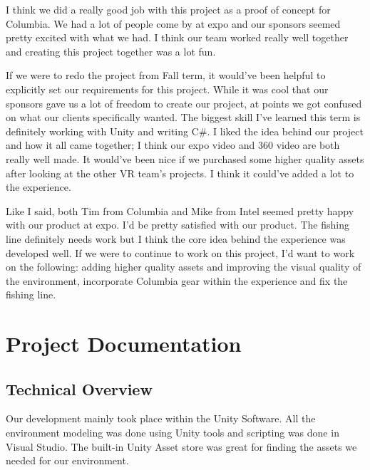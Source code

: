 \documentclass[10pt,journal,compsoc,onecolumn, draftclsnofoot]{IEEEtran}
\begin{document}
I think we did a really good job with this project as a proof of concept for Columbia. We had a lot of people come by at expo and our sponsors seemed pretty excited with what we had. I think our team worked really well together and creating this project together was a lot fun.

If we were to redo the project from Fall term, it would've been helpful to explicitly set our requirements for this project. While it was cool that our sponsors gave us a lot of freedom to create our project, at points we got confused on what our clients specifically wanted. The biggest skill I've learned this term is definitely working with Unity and writing C\#. I liked the idea behind our project and how it all came together; I think our expo video and 360 video are both really well made. It would've been nice if we purchased some higher quality assets after looking at the other VR team's projects. I think it could've added a lot to the experience.

Like I said, both Tim from Columbia and Mike from Intel seemed pretty happy with our product at expo. I'd be pretty satisfied with our product. The fishing line definitely needs work but I think the core idea behind the experience was developed well. If we were to continue to work on this project, I'd want to work on the following: adding higher quality assets and improving the visual quality of the environment, incorporate Columbia gear within the experience and fix the fishing line.

\clearpage

\vspace*{\fill}
\section*{}
\vspace*{\fill}


\section{Project Documentation}
\subsection{Technical Overview}
Our development mainly took place within the Unity Software. All the environment modeling was done using Unity tools and scripting was done in Visual Studio. The built-in Unity Asset store was great for finding the assets we needed for our environment.
\end{document}
